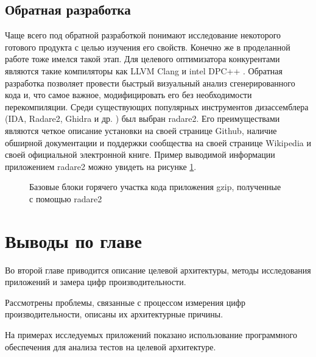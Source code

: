 \subsection{Обратная разработка}\label{p1:optop:reverse}

Чаще всего под обратной разработкой понимают исследование некоторого готового продукта с целью изучения его свойств. Конечно же в проделанной работе тоже имелся такой этап. Для целевого оптимизатора конкурентами являются такие компиляторы как LLVM Clang \cite{lattner2008llvm} и intel DPC++ \cite{castano2022evaluation}. Обратная разработка позволяет провести быстрый визуальный анализ сгенерированного кода и, что самое важное,  модифицировать его без необходимости перекомпиляции. Среди существующих популярных инструментов дизассемблера (IDA, Radare2, Ghidra и др. \cite{ferguson2008reverse, mester2023malware, jiang2022comprehensive}) был выбран radare2. Его преимуществами являются четкое описание установки на своей странице Github, наличие обширной документации и поддержки сообщества на своей странице Wikipedia и своей официальной электронной книге. Пример выводимой информации приложением radare2 можно увидеть на рисунке \ref{radare2}.

\begin{figure}[htbp]
	\centering
	
	\caption{Базовые блоки горячего участка кода приложения gzip, полученные с помощью radare2}
	\label{radare2}
\end{figure}

\section{Выводы по главе}

Во второй главе приводится описание целевой архитектуры,  методы исследования приложений и замера цифр производительности. 

Рассмотрены проблемы, связанные с процессом измерения цифр производительности, описаны их архитектурные причины.

На примерах исследуемых приложений показано использование программного обеспечения для анализа тестов на целевой архитектуре.



